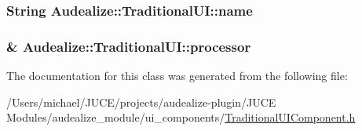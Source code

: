 \subsubsection[{\texorpdfstring{name}{name}}]{\setlength{\rightskip}{0pt plus 5cm}String Audealize\+::\+Traditional\+U\+I\+::name\hspace{0.3cm}{\ttfamily [protected]}}\hypertarget{class_audealize_1_1_traditional_u_i_a109b231a9fd2e92f49d74ce297283fae}{}\label{class_audealize_1_1_traditional_u_i_a109b231a9fd2e92f49d74ce297283fae}
\subsubsection[{\texorpdfstring{processor}{processor}}]{\& Audealize\+::\+Traditional\+U\+I\+::processor\hspace{0.3cm}{\ttfamily [protected]}}\hypertarget{class_audealize_1_1_traditional_u_i_a8907d173ae02664d30ef7eeb09f54bb3}{}\label{class_audealize_1_1_traditional_u_i_a8907d173ae02664d30ef7eeb09f54bb3}


The documentation for this class was generated from the following file\+:\begin{DoxyCompactItemize}
\item 
/\+Users/michael/\+J\+U\+C\+E/projects/audealize-\/plugin/\+J\+U\+C\+E Modules/audealize\+\_\+module/ui\+\_\+components/\hyperlink{_traditional_u_i_component_8h}{Traditional\+U\+I\+Component.\+h}\end{DoxyCompactItemize}
